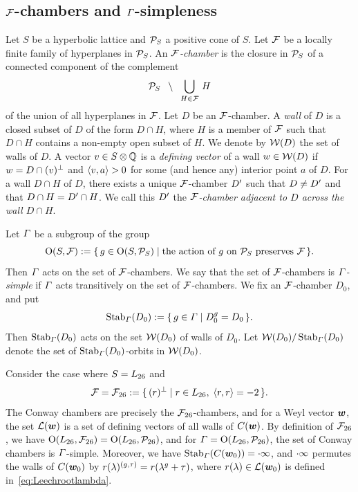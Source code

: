 \documentclass{amsart} %
\begin{document}
\subsection{$\mathord{\mathcal{F}}$-chambers and $\varGamma$-simpleness}\label{subsec:FFF}
%
%
Let $S$ be a hyperbolic lattice
and $\mathord{\mathcal{P}}_S$ a positive cone of $S$.
Let $\mathord{\mathcal{F}}$ be a locally finite family of hyperplanes in $\mathord{\mathcal{P}}_S$.
An \emph{$\mathord{\mathcal{F}}$-chamber} is the closure in $\mathord{\mathcal{P}}_S$ of a connected component 
of the complement
\[
\mathord{\mathcal{P}}_S\;\;\setminus \;\; \bigcup_{H\in \mathord{\mathcal{F}}}\, H
\]
of the union of all hyperplanes in $\mathord{\mathcal{F}}$.
Let $D$ be an $\mathord{\mathcal{F}}$-chamber.
A \emph{wall} of $D$ is a closed subset of $D$
of the form $D\cap H$, where $H$ is a member of $\mathord{\mathcal{F}}$
such that $D\cap H$ contains a non-empty open subset of $H$.
We denote by $\mathord{\mathcal{W}}(D)$ the set of walls of $D$.
A vector $v\in S\otimes\mathord{\mathbb{Q}}$ is a \emph{defining vector} of a wall $w\in \mathord{\mathcal{W}}(D)$ 
if $w=D\cap (v)^{\perp}$ and $\langle v, a \rangle>0$ for some (and hence any) interior point $a$ of $D$.
For a wall $D\cap H$ of $D$,
there exists a unique $\mathord{\mathcal{F}}$-chamber $D^{\prime}$
such that $D\ne D^{\prime}$ and that $D\cap H=D^{\prime}\cap H$.
We call this $D^{\prime}$ the \emph{$\mathord{\mathcal{F}}$-chamber adjacent to $D$ across the wall $D\cap H$}.
\par
%
Let $\varGamma$ be a subgroup
of the group 
\[
\mathord{\mathrm{O}}(S, \mathord{\mathcal{F}}):=\{\,{g\in \mathord{\mathrm{O}}(S, \mathord{\mathcal{P}}_S)}\mid {\textrm{the action of $g$ on $\mathord{\mathcal{P}}_S$ preserves $\mathord{\mathcal{F}}$}} \,\}.
\]
%
%
Then $\varGamma$ acts on the set of $\mathord{\mathcal{F}}$-chambers.
We say that the set of $\mathord{\mathcal{F}}$-chambers is \emph{$\varGamma$-simple}
if $\varGamma$ acts transitively on the set of $\mathord{\mathcal{F}}$-chambers.
We fix an $\mathord{\mathcal{F}}$-chamber $D_0$, and put
\[
\operatorname{Stab}_{\varGamma}(D_0):=\{\,{g\in \varGamma}\mid {D_0^g=D_0} \,\}.
\]
Then $\operatorname{Stab}_{\varGamma}(D_0)$ acts on the set $\mathord{\mathcal{W}}(D_0)$ of walls of $D_0$.
Let $\mathord{\mathcal{W}}(D_0)/\operatorname{Stab}_{\varGamma}(D_0)$ denote the set of 
$\operatorname{Stab}_{\varGamma}(D_0)$-orbits in $\mathord{\mathcal{W}}(D_0)$.
%
\begin{example}
Consider the case where $S=L_{26}$ and 
\[
\mathord{\mathcal{F}}={\mathord{\mathcal{F}}}_{26}:= \{\,{(r)^{\perp}}\mid {r\in L_{26},\;  \langle r, r \rangle=-2} \,\}.
\]
The Conway chambers are precisely the ${\mathord{\mathcal{F}}}_{26}$-chambers,
and for a Weyl vector $\boldsymbol{w}$,
the set $\mathord{\mathcal{L}}(\boldsymbol{w})$ %
is 
a set of 
defining vectors of all walls of $\mathord{C}(\boldsymbol{w})$.
By  definition of ${\mathord{\mathcal{F}}}_{26}$, 
we have $\mathord{\mathrm{O}}(L_{26}, {\mathord{\mathcal{F}}}_{26})=\mathord{\mathrm{O}}(L_{26}, \mathord{\mathcal{P}}_{26})$,
and for $\varGamma=\mathord{\mathrm{O}}(L_{26}, \mathord{\mathcal{P}}_{26})$,
the set of Conway chambers  is $\varGamma$-simple.
Moreover, we have $\operatorname{Stab}_{\varGamma}(\mathord{C}(\boldsymbol{w}_0))=\cdot \infty$,
and $\cdot \infty$ 
 permutes 
the walls of $\mathord{C}(\boldsymbol{w}_0)$ by 
$r(\lambda)^{(g, \tau)}=r(\lambda^g+\tau)$,
where $r(\lambda)\in \mathord{\mathcal{L}}(\boldsymbol{w}_0)$ is 
defined in~\eqref{eq:Leechrootlambda}.
\end{example}
\end{document}
